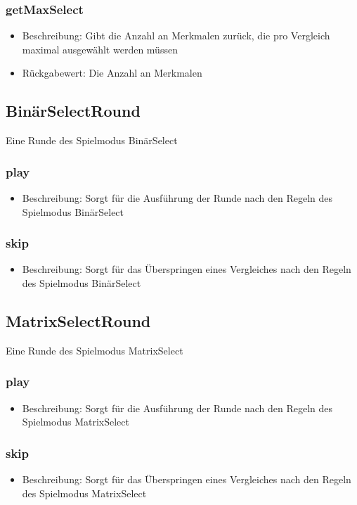 \documentclass[a4paper]{scrreprt}
\begin{document}
	\subsubsection{getMaxSelect}
	\begin{itemize}
		\item Beschreibung: Gibt die Anzahl an Merkmalen zurück, die pro Vergleich maximal ausgewählt werden müssen
		\item Rückgabewert: Die Anzahl an Merkmalen
	\end{itemize}
	
	
	\subsection{BinärSelectRound}
	Eine Runde des Spielmodus BinärSelect
	\subsubsection{play}
	\begin{itemize}
		\item Beschreibung: Sorgt für die Ausführung der Runde nach den Regeln des Spielmodus BinärSelect
	\end{itemize}
	\subsubsection{skip}
	\begin{itemize}
		\item Beschreibung: Sorgt für das Überspringen eines Vergleiches nach den Regeln des Spielmodus BinärSelect
	\end{itemize}
	
	\subsection{MatrixSelectRound}
	Eine Runde des Spielmodus MatrixSelect
	\subsubsection{play}
	\begin{itemize}
		\item Beschreibung: Sorgt für die Ausführung der Runde nach den Regeln des Spielmodus MatrixSelect
	\end{itemize}
	\subsubsection{skip}
	\begin{itemize}
		\item Beschreibung: Sorgt für das Überspringen eines Vergleiches nach den Regeln des Spielmodus MatrixSelect
	\end{itemize}
	
\end{document}
